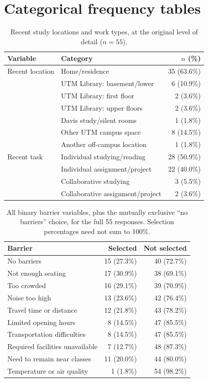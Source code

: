 \documentclass[11pt,letterpaper]{article}
\begin{document}
\section{Categorical frequency tables}\label{app:freq}
\begin{table}[H]\centering\small
\begin{tabular}{@{}p{3cm}p{7.7cm}r@{}}\toprule
Variable & Category & $n$ (\%)\\\midrule
Recent location & Home/residence & 35 (63.6\%)\\
 & UTM Library: basement/lower & 6 (10.9\%)\\
 & UTM Library: first floor & 2 (3.6\%)\\
 & UTM Library: upper floors & 2 (3.6\%)\\
 & Davis study/silent rooms & 1 (1.8\%)\\
 & Other UTM campus space & 8 (14.5\%)\\
 & Another off-campus location & 1 (1.8\%)\\\midrule
Recent task & Individual studying/reading & 28 (50.9\%)\\
 & Individual assignment/project & 22 (40.0\%)\\
 & Collaborative studying & 3 (5.5\%)\\
 & Collaborative assignment/project & 2 (3.6\%)\\\bottomrule\end{tabular}
 \caption{Recent study locations and work types, at the original level of detail ($n=55$).}
 \end{table}

\begin{table}[H]\centering\small
\begin{tabular}{@{}p{7.3cm}rr@{}}\toprule
Barrier & Selected & Not selected\\\midrule
No barriers & 15 (27.3\%) & 40 (72.7\%)\\
Not enough seating & 17 (30.9\%) & 38 (69.1\%)\\
Too crowded & 16 (29.1\%) & 39 (70.9\%)\\
Noise too high & 13 (23.6\%) & 42 (76.4\%)\\
Travel time or distance & 12 (21.8\%) & 43 (78.2\%)\\
Limited opening hours & 8 (14.5\%) & 47 (85.5\%)\\
Transportation difficulties & 8 (14.5\%) & 47 (85.5\%)\\
Required facilities unavailable & 7 (12.7\%) & 48 (87.3\%)\\
Need to remain near classes & 11 (20.0\%) & 44 (80.0\%)\\
Temperature or air quality & 1 (1.8\%) & 54 (98.2\%)\\\bottomrule\end{tabular}
\caption{All binary barrier variables, plus the mutually exclusive ``no barriers'' choice, for the full 55 responses. Selection percentages need not sum to 100\%.}
\end{table}
\end{document}
